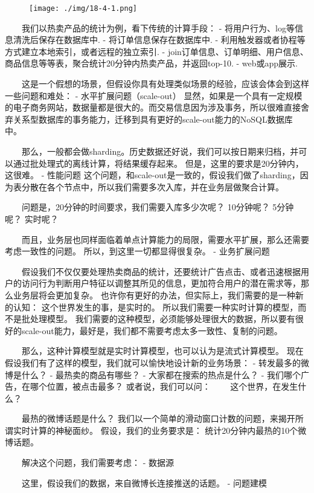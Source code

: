 \begin{figure}
\centering
\texttt{[image: ./img/18-4-1.png]}
\caption{}
\end{figure}

  我们以热卖产品的统计为例，看下传统的计算手段： -
将用户行为、log等信息清洗后保存在数据库中. - 将订单信息保存在数据库中. -
利用触发器或者协程等方式建立本地索引，或者远程的独立索引. -
join订单信息、订单明细、用户信息、商品信息等等表，聚合统计20分钟内热卖产品，并返回top-10.
- web或app展示.

  这是一个假想的场景，但假设你具有处理类似场景的经验，应该会体会到这样一些问题和难处：
- 水平扩展问题（scale-out）
显然，如果是一个具有一定规模的电子商务网站，数据量都是很大的。而交易信息因为涉及事务，所以很难直接舍弃关系型数据库的事务能力，迁移到具有更好的scale-out能力的NoSQL数据库中。

  那么，一般都会做sharding。历史数据还好说，我们可以按日期来归档，并可以通过批处理式的离线计算，将结果缓存起来。
但是，这里的要求是20分钟内，这很难。 - 性能问题
这个问题，和scale-out是一致的，假设我们做了sharding，因为表分散在各个节点中，所以我们需要多次入库，并在业务层做聚合计算。

  问题是，20分钟的时间要求，我们需要入库多少次呢？ 10分钟呢？ 5分钟呢？
实时呢？

  而且，业务层也同样面临着单点计算能力的局限，需要水平扩展，那么还需要考虑一致性的问题。
所以，到这里一切都显得很复杂。 - 业务扩展问题

  假设我们不仅仅要处理热卖商品的统计，还要统计广告点击、或者迅速根据用户的访问行为判断用户特征以调整其所见的信息，更加符合用户的潜在需求等，那么业务层将会更加复杂。
也许你有更好的办法，但实际上，我们需要的是一种新的认知：
这个世界发生的事，是实时的。
所以我们需要一种实时计算的模型，而不是批处理模型。
我们需要的这种模型，必须能够处理很大的数据，所以要有很好的scale-out能力，最好是，我们都不需要考虑太多一致性、复制的问题。

  那么，这种计算模型就是实时计算模型，也可以认为是流式计算模型。
现在假设我们有了这样的模型，我们就可以愉快地设计新的业务场景： -
转发最多的微博是什么？ - 最热卖的商品有哪些？ -
大家都在搜索的热点是什么？ - 我们哪个广告，在哪个位置，被点击最多？
或者说，我们可以问：   这个世界，在发生什么？

  最热的微博话题是什么？
我们以一个简单的滑动窗口计数的问题，来揭开所谓实时计算的神秘面纱。
假设，我们的业务要求是： 统计20分钟内最热的10个微博话题。

  解决这个问题，我们需要考虑： - 数据源

  这里，假设我们的数据，来自微博长连接推送的话题。 - 问题建模


